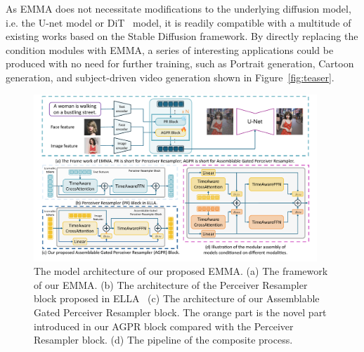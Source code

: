 As EMMA does not necessitate modifications to the underlying diffusion model, i.e. the U-net model or DiT~\cite{chen2023pixart, dit} model, 
it is readily compatible with a multitude of existing works based on the Stable Diffusion framework. By directly replacing the condition modules with EMMA, a series of interesting applications could be produced with no need for further training, such as Portrait generation, Cartoon generation, and subject-driven video generation shown in Figure~\ref{fig:teaser}. 

\begin{figure}[t]
    \centering
    \includegraphics[width=0.95\textwidth]{images/methods.pdf}
    \caption{The model architecture of our proposed EMMA. (a) The framework of our EMMA. (b) The architecture of the Perceiver Resampler block proposed in ELLA~\cite{hu2024ella} (c) The architecture of our Assemblable Gated Perceiver Resampler block. The orange part is the novel part introduced in our AGPR block compared with the Perceiver Resampler block. (d) The pipeline of the composite process. }
    \label{fig:methods}
\end{figure}

